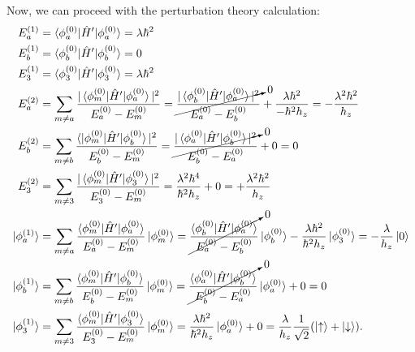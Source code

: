 \documentclass[10pt]{article}
\newcommand{\1}{\mathbf 1}
\begin{document}
Now, we can proceed with the perturbation theory calculation:
\begin{align}
	E_a^{(1)}
	&=
	\braket{\phi_a^{(0)} | \hat H' | \phi_a^{(0)}}
	=
	\lambda\hbar^2
	\\
	E_b^{(1)}
	&=
	\braket{\phi_b^{(0)} | \hat H' | \phi_b^{(0)}}
	=
	0
	\\
	E_3^{(1)}
	&=
	\braket{\phi_3^{(0)} | \hat H' | \phi_3^{(0)}}
	=
	\lambda\hbar^2
	\\
	E_a^{(2)}
	&=
	\sum_{m \ne a}
	\frac{|\braket{\phi_m^{(0)} | \hat H' | \phi_a^{(0)}}|^2}{E_a^{(0)} - E_m^{(0)}}
	=
	\cancelto{0}{\frac{|\braket{\phi_b^{(0)} | \hat H' | \phi_a^{(0)}}|^2}{E_a^{(0)} - E_b^{(0)}}}
	+
	\frac{\lambda\hbar^2}{-\hbar^2 h_z}
	=
	-\frac{\lambda^2\hbar^2}{h_z}
	\\
	E_b^{(2)}
	&=
	\sum_{m \ne b}
	\frac{\braket{|\phi_m^{(0)} | \hat H' | \phi_b^{(0)}}|^2}{E_b^{(0)} - E_m^{(0)}}
	=
	\cancelto{0}{\frac{|\braket{\phi_a^{(0)} | \hat H' | \phi_b^{(0)}}|^2}{E_b^{(0)} - E_a^{(0)}}}
	+
	0
	=
	0
	\\
	E_3^{(2)}
	&=
	\sum_{m \ne 3}
	\frac{|\braket{\phi_m^{(0)} | \hat H' | \phi_3^{(0)}}|^2}{E_3^{(0)} - E_m^{(0)}}
	=
	\frac{\lambda^2\hbar^4}{\hbar^2 h_z}
	+
	0
	=
	+
	\frac{\lambda^2\hbar^2}{h_z}
	\\
	\ket{\phi^{(1)}_a}
	&=
	\sum_{m \ne a}
	\frac{\braket{\phi_m^{(0)} | \hat H' | \phi_a^{(0)}}}{E_a^{(0)} - E_m^{(0)}}
	\ket{\phi_m^{(0)}}
	=
	\cancelto{0}{\frac{\braket{\phi_b^{(0)} | \hat H' | \phi_a^{(0)}}}{E_a^{(0)} - E_b^{(0)}}}
	\ket{\phi_b^{(0)}}
	-
	\frac{\lambda\hbar^2}{\hbar^2 h_z}
	\ket{\phi_3^{(0)}}
	=
	-
	\frac{\lambda}{ h_z}
	\ket{0}
	\\
	\ket{\phi^{(1)}_b}
	&=
	\sum_{m \ne b}
	\frac{\braket{\phi_m^{(0)} | \hat H' | \phi_b^{(0)}}}{E_b^{(0)} - E_m^{(0)}}
	\ket{\phi_m^{(0)}}
	=
	\cancelto{0}{\frac{\braket{\phi_a^{(0)} | \hat H' | \phi_b^{(0)}}}{E_b^{(0)} - E_a^{(0)}}}
	\ket{\phi_a^{(0)}}
	+
	0
	=
	0
	\\
	\ket{\phi^{(1)}_3}
	&=
	\sum_{m \ne 3}
	\frac{\braket{\phi_m^{(0)} | \hat H' | \phi_3^{(0)}}}{E_3^{(0)} - E_m^{(0)}}
	\ket{\phi_m^{(0)}}
	=
	\frac{\lambda\hbar^2}{\hbar^2 h_z}
	\ket{\phi_a^{(0)}}
	+
	0
	=
	\frac{\lambda}{h_z} \frac{1}{\sqrt{2}}
	(\ket{\uparrow} + \ket{\downarrow}).
\end{align}
\end{document}
